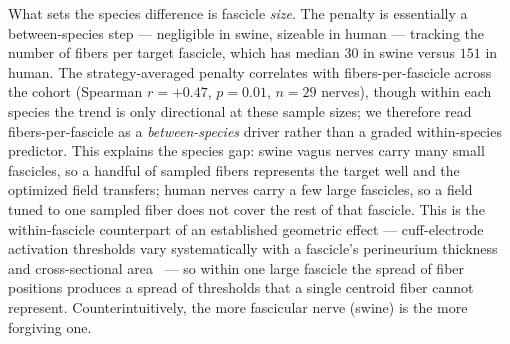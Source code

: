 What sets the species difference is fascicle \emph{size}.  The penalty is
essentially a between-species step --- negligible in swine, sizeable in
human --- tracking the number of fibers per target fascicle, which has
median $30$ in swine versus $151$ in human.  The strategy-averaged penalty
correlates with fibers-per-fascicle across the cohort (Spearman
$r = +0.47$, $p = 0.01$, $n = 29$ nerves), though within each species the
trend is only directional at these sample sizes; we therefore read
fibers-per-fascicle as a \emph{between-species} driver rather than a
graded within-species predictor.
This explains the species gap: swine vagus nerves carry
many small fascicles, so a handful of sampled fibers represents the
target well and the optimized field transfers; human nerves carry a few
large fascicles, so a field tuned to one sampled fiber does not cover
the rest of that fascicle.  This is the within-fascicle counterpart of
an established geometric effect --- cuff-electrode activation thresholds
vary systematically with a fascicle's perineurium thickness and
cross-sectional area~\cite{davis2023fascicle} --- so within one large
fascicle the spread of fiber positions produces a spread of thresholds
that a single centroid fiber cannot represent.  Counterintuitively, the
more fascicular nerve (swine) is the more forgiving one.

